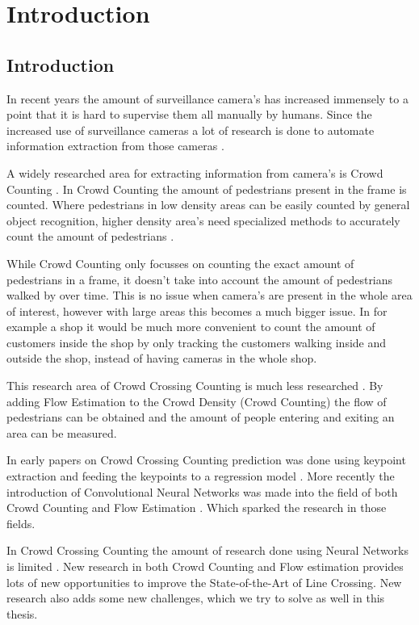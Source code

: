\chapter{Introduction}
\section{Introduction}
In recent years the amount of surveillance camera's has increased immensely to a point that it is hard to supervise them all manually by humans. Since the increased use of surveillance cameras a lot of research is done to automate information extraction from those cameras \cite{Sreenu2019}.

A widely researched area for extracting information from camera's is Crowd Counting \cite{Chan2008, wang2020nwpu, li2018csrnet, Fang2019, Liu2019}. In Crowd Counting the amount of pedestrians present in the frame is counted. Where pedestrians in low density areas can be easily counted by general object recognition, higher density area's need specialized methods to accurately count the amount of pedestrians \cite{Zhang2016}.

While Crowd Counting only focusses on counting the exact amount of pedestrians in a frame, it doesn't take into account the amount of pedestrians walked by over time. This is no issue when camera's are present in the whole area of interest, however with large areas this becomes a much bigger issue. In for example a shop it would be much more convenient to count the amount of customers inside the shop by only tracking the customers walking inside and outside the shop, instead of having cameras in the whole shop.

This research area of Crowd Crossing Counting is much less researched \cite{Ma2013, leibe_crossing-line_2016, zheng_cross-line_2019}. By adding Flow Estimation to the Crowd Density (Crowd Counting) the flow of pedestrians can be obtained and the amount of people entering and exiting an area can be measured.

In early papers on Crowd Crossing Counting prediction was done using keypoint extraction and feeding the keypoints to a regression model \cite{ma_counting_2016, Ma2013}. More recently the introduction of Convolutional Neural Networks was made into the field of both Crowd Counting \cite{Zhang2016, Liu2019, li2018csrnet, wang2020nwpu} and Flow Estimation \cite{sun_pwc-net_2018, Dosovitskiy2015}. Which sparked the research in those fields.

In Crowd Crossing Counting the amount of research done using Neural Networks is limited \cite{leibe_crossing-line_2016, cao_large_2015}. New research in both Crowd Counting and Flow estimation provides lots of new opportunities to improve the State-of-the-Art of Line Crossing. New research also adds some new challenges, which we try to solve as well in this thesis.

